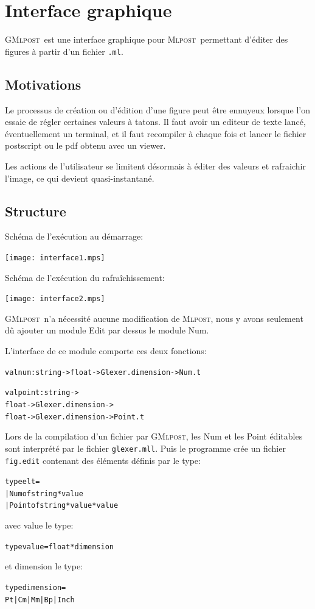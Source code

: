 \documentclass[a4paper,12pt]{article}
\newcommand{\mlpost}{\textsc{Mlpost}}
\newcommand{\gmlpost}{\textsc{GMlpost}}
\begin{document}
\section{Interface graphique}
\gmlpost\ est une interface graphique pour \mlpost\ permettant d'éditer des figures à partir d'un fichier \texttt{.ml}. 
\subsection{Motivations}
Le processus de création ou d'édition d'une figure peut être ennuyeux lorsque l'on essaie de régler certaines valeurs à tatons. Il faut avoir un editeur de texte lancé, éventuellement un terminal, et il faut recompiler à chaque fois et lancer le fichier postscript ou le pdf obtenu avec un viewer.

Les actions de l'utilisateur se limitent désormais à éditer des valeurs et rafraichir l'image, ce qui devient quasi-instantané.
\subsection{Structure}

Schéma de l'exécution au démarrage:
\begin{center}
\texttt{[image: interface1.mps]}
\end{center}

\bigskip

Schéma de l'exécution du rafraîchissement:
\begin{center}
\texttt{[image: interface2.mps]}
\end{center}

\bigskip

\gmlpost\ n'a nécessité aucune modification de \mlpost, nous y avons seulement dû ajouter un module Edit par dessus le module Num.

L'interface de ce module comporte ces deux fonctions:
\begin{alltt}
  val num: string -> float -> Glexer.dimension -> Num.t

  val point: string -> 
  float -> Glexer.dimension -> 
  float -> Glexer.dimension -> Point.t
\end{alltt}

Lors de la compilation d'un fichier par \gmlpost, les Num et les Point éditables sont interprété par le fichier \texttt{glexer.mll}. Puis le programme crée un fichier \texttt{fig.edit} contenant des éléments définis par le type:
\begin{alltt}
  type elt = 
  | Num of string * value
  | Point of string * value * value
\end{alltt}
avec value le type:
\begin{alltt}
  type value = float * dimension
\end{alltt}
et dimension le type:
\begin{alltt}
  type dimension =
  Pt | Cm | Mm | Bp | Inch
\end{alltt}
\end{document}
